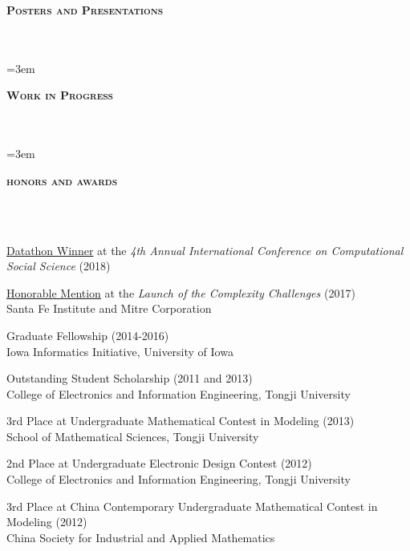 \documentclass{article}
\newcommand{\header}[1]{{
\hspace*{-15pt}\vspace*{6pt} \textbf{\textsc{\large{#1}}}} \vspace*{-6pt} 
\lineunder
}
\newcommand{\lineunder}{
\vspace*{-8pt} \\ \hspace*{-15pt} 
\hrulefill \\
}
\renewcommand{\labelitemii}{
$\vcenter{\hbox{\tiny$\bullet$}}$\hspace*{-3pt}
}
\newenvironment{bullet-list-major}{
\begin{list}{\labelitemii}{\setlength\leftmargin{3pt} 
\topsep 0pt \itemsep -2pt}}{\vspace*{4pt}\end{list}
}
\begin{document}
\vspace*{4pt}%
\header{Posters and Presentations}

\nocite{*}
\newrefcontext[labelprefix=S]
\emergencystretch=3em
\printbibliography[keyword={S},heading=none] 

\vspace*{4pt}%
\header{Work in Progress}

\nocite{*}
\newrefcontext[labelprefix=M]
\emergencystretch=3em
\printbibliography[keyword=M,heading=none] 
%



\vspace*{4pt}
\header{honors and awards}
\begin{bullet-list-major}
    \item \href{https://github.com/zhiyzuo/ic2s2_datathon/blob/master/datathon.pdf}{Datathon Winner} at the \textit{4th Annual International Conference on Computational Social Science} (2018)
    \item \href{https://bitbucket.org/zhiyzuo/complexity-challenge/src/master/}{Honorable Mention} at the \textit{Launch of the Complexity Challenges} (2017) \\
    Santa Fe Institute and Mitre Corporation
    \item Graduate Fellowship (2014-2016) \\
    Iowa Informatics Initiative, University of Iowa
    \item Outstanding Student Scholarship (2011 and 2013) \\
    College  of  Electronics  and  Information  Engineering, Tongji  University
    \item 3rd Place at Undergraduate Mathematical Contest in Modeling (2013) \\
    School of Mathematical Sciences, Tongji University
    \item 2nd Place at Undergraduate Electronic Design Contest (2012) \\
    College of Electronics and Information Engineering, Tongji University
    \item 3rd Place at China Contemporary Undergraduate Mathematical Contest in Modeling (2012) \\
    China Society for Industrial and Applied Mathematics
\end{bullet-list-major}
\end{document}
